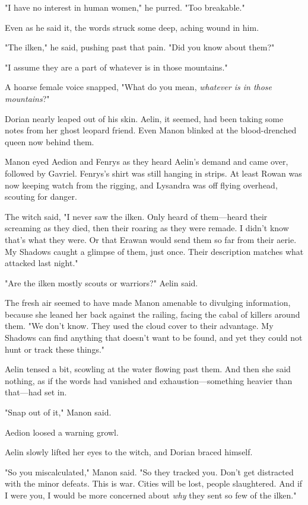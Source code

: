"I have no interest in human women," he purred.
"Too breakable."

Even as he said it, the words struck some deep, aching wound in him.

"The ilken," he said, pushing past that pain.
"Did you know about them?"

"I assume they are a part of whatever is in those mountains."

A hoarse female voice snapped, "What do you mean, \emph{whatever is in those mountains}?"

Dorian nearly leaped out of his skin.
Aelin, it seemed, had been taking some notes from her ghost leopard friend.
Even Manon blinked at the blood-drenched queen now behind them.

Manon eyed Aedion and Fenrys as they heard Aelin's demand and came over, followed by Gavriel.
Fenrys's shirt was still hanging in strips.
At least Rowan was now keeping watch from the rigging, and Lysandra was off flying overhead, scouting for danger.

The witch said, "I never saw the ilken.
Only heard of them---heard their screaming as they died, then their roaring as they were remade.
I didn't know that's what they were.
Or that Erawan would send them so far from their aerie.
My Shadows caught a glimpse of them, just once.
Their description matches what attacked last night."

"Are the ilken mostly scouts or warriors?"
Aelin said.

The fresh air seemed to have made Manon amenable to divulging information, because she leaned her back against the railing, facing the cabal of killers around them.
"We don't know.
They used the cloud cover to their advantage.
My Shadows can find anything that doesn't want to be found, and yet they could not hunt or track these things."

Aelin tensed a bit, scowling at the water flowing past them.
And then she said nothing, as if the words had vanished and exhaustion---something heavier than that---had set in.

"Snap out of it," Manon said.

Aedion loosed a warning growl.

Aelin slowly lifted her eyes to the witch, and Dorian braced himself.

"So you miscalculated," Manon said.
"So they tracked you.
Don't get distracted with the minor defeats.
This is war.
Cities will be lost, people slaughtered.
And if I were you, I would be more concerned about \emph{why} they sent so few of the ilken."

